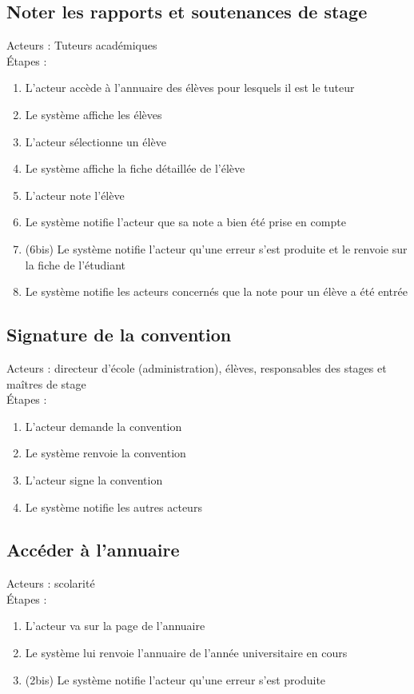 \documentclass{scrreprt}
\begin{document}
\subsection{Noter les rapports et soutenances de stage}
Acteurs : Tuteurs académiques
\\
\'Etapes : 
\begin{enumerate}
\item L’acteur accède à l’annuaire des élèves pour lesquels il est le tuteur
\item Le système affiche les élèves
\item L’acteur sélectionne un élève
\item Le système affiche la fiche détaillée de l’élève
\item L’acteur note l’élève
\item Le système notifie l’acteur que sa note a bien été prise en compte
\item (6bis) Le système notifie l’acteur qu’une erreur s’est produite et le renvoie sur la fiche de l’étudiant
\item Le système notifie les acteurs concernés que la note pour un élève a été entrée
\end{enumerate}


\subsection{Signature de la convention}
Acteurs : directeur d’\'ecole (administration), \'el\`eves, responsables des stages et ma\^itres de stage
\\
\'Etapes : 
\begin{enumerate}
\item L’acteur demande la convention 
\item Le syst\`eme renvoie la convention
\item L’acteur signe la convention
\item Le syst\`eme notifie les autres acteurs
\end{enumerate}


\subsection{Accéder à l’annuaire}
Acteurs : scolarité
\\
\'Etapes : 
\begin{enumerate}
\item L’acteur va sur la page de l’annuaire
\item Le système lui renvoie l’annuaire de l’année universitaire en cours
\item (2bis) Le système notifie l’acteur qu’une erreur s’est produite
\end{enumerate}
\end{document}
